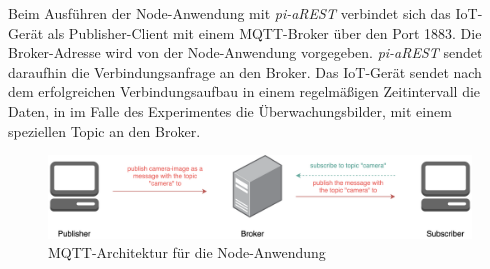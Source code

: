 Beim Ausführen der Node-Anwendung mit \textit{pi-aREST} verbindet sich das IoT-Gerät als Publisher-Client
mit einem MQTT-Broker über den Port 1883. Die Broker-Adresse wird von der Node-Anwendung vorgegeben.
\textit{pi-aREST} sendet daraufhin die Verbindungsanfrage an den Broker. Das IoT-Gerät sendet nach dem 
erfolgreichen Verbindungsaufbau in einem regelmäßigen Zeitintervall die Daten, in im Falle des Experimentes
die Überwachungsbilder, mit einem speziellen Topic an den Broker. \cite{piarestgtihub} \\

\begin{figure}[h]
  \centering
  \includegraphics[width=145mm]{images/mqtt.png}
  \caption{MQTT-Architektur für die Node-Anwendung \cite{mqtt}}
  \label{fig:arch-mqtt}
\end{figure}

